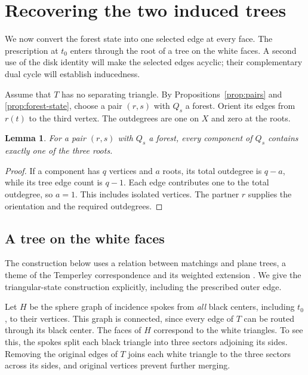 \documentclass[11pt]{article}
\newtheorem{lemma}[theorem]{Lemma}
\theoremstyle{remark}
\numberwithin{equation}{section}
\begin{document}
\section{Recovering the two induced trees}\label{sec:trees}

We now convert the forest state into one selected edge at every face.
The prescription at \(t_0\) enters through the root of a tree on the
white faces. A second use of the disk identity will make the selected
edges acyclic; their complementary dual cycle will establish inducedness.

Assume that \(T\) has no separating triangle.
By Propositions~\ref{prop:pairs} and \ref{prop:forest-state},
choose a pair \((r,s)\) with \(Q_s\) a forest.
Orient its edges from \(r(t)\) to the third vertex.
The outdegrees are one on \(X\) and zero at the roots.
\begin{lemma}\label{lem:root-components}
For a pair \((r,s)\) with \(Q_s\) a forest, every component of
\(Q_s\) contains exactly one of the three roots.
\end{lemma}

\begin{proof}
If a component has \(q\) vertices and \(a\) roots, its total
outdegree is \(q-a\), while its tree edge count is \(q-1\).
Each edge contributes one to the total outdegree, so \(a=1\).
This includes isolated vertices. The partner \(r\) supplies the
orientation and the required outdegrees.
\end{proof}

\subsection{A tree on the white faces}

The construction below uses a relation between matchings and plane
trees, a theme of the Temperley correspondence and its weighted
extension \cite[Theorem~1]{KPW2000}. We give the triangular-state
construction explicitly, including the prescribed outer edge.

Let \(H\) be the sphere graph of incidence spokes from
\emph{all} black centers, including \(t_0\), to their
vertices. This graph is connected, since every edge
of \(T\) can be routed through its black center.
The faces of \(H\) correspond to the white triangles.
To see this, the spokes split each black triangle
into three sectors adjoining its sides. Removing
the original edges of \(T\) joins each white triangle
to the three sectors across its sides, and original
vertices prevent further merging.
\end{document}
